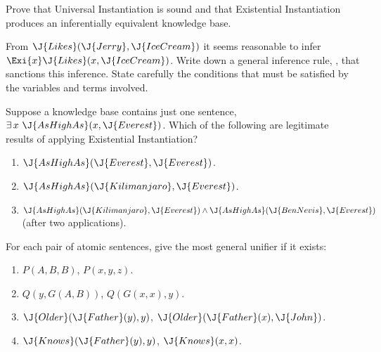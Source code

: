 \setlength{\medskipamount}{1.6\medskipamount}%


\begin{exercise}
Prove that Universal Instantiation
is sound and that Existential Instantiation produces
an inferentially equivalent knowledge base.
\end{exercise} 

\begin{exercise}
From \(\J{Likes}(\J{Jerry},\J{IceCream})\) it seems reasonable to infer \(\Exi{x}
\J{Likes}(x,\J{IceCream})\). Write down a general inference rule,
,
that sanctions this inference. State carefully the conditions
that must be satisfied by the variables and terms involved.
\end{exercise} 

\begin{exercise}
Suppose a knowledge base contains just one sentence, \(\exists\,x\ \J{AsHighAs}(x,\J{Everest})\).
Which of the following are legitimate results of applying Existential Instantiation?
\begin{enumerate}
\item \(\J{AsHighAs}(\J{Everest},\J{Everest})\).
\item \(\J{AsHighAs}(\J{Kilimanjaro},\J{Everest})\).
\item \(\J{AsHighAs}(\J{Kilimanjaro},\J{Everest}) \land \J{AsHighAs}(\J{BenNevis},\J{Everest})\) \\
(after two applications).
\end{enumerate}
\end{exercise} 



\begin{uexercise}
For each pair of atomic sentences,
give the most 
 general unifier if it exists:
\begin{enumerate}
\item \(P(A,B,B)\), \(P(x,y,z)\).
\item \(Q(y,G(A,B))\), \(Q(G(x,x),y)\).
\item \(\J{Older}(\J{Father}(y),y)\), \(\J{Older}(\J{Father}(x),\J{John})\).
\item \(\J{Knows}(\J{Father}(y),y)\), \(\J{Knows}(x,x)\).
\end{enumerate}
\end{uexercise} 

